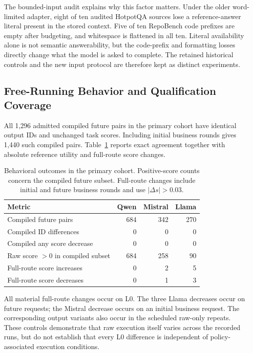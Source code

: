 The bounded-input audit explains why this factor matters. Under the older word-limited adapter, eight of ten audited HotpotQA sources lose a reference-answer literal present in the stored context. Five of ten RepoBench code prefixes are empty after budgeting, and whitespace is flattened in all ten. Literal availability alone is not semantic answerability, but the code-prefix and formatting losses directly change what the model is asked to complete. The retained historical controls and the new input protocol are therefore kept as distinct experiments.

\subsection{Free-Running Behavior and Qualification Coverage}
\label{sec:quality}
All 1,296 admitted compiled future pairs in the primary cohort have identical output IDs and unchanged task scores. Including initial business rounds gives 1,440 such compiled pairs. Table~\ref{tab:quality} reports exact agreement together with absolute reference utility and full-route score changes.

\begin{table}[t]
\centering\small
\caption{Behavioral outcomes in the primary cohort. Positive-score counts concern the compiled future subset. Full-route changes include initial and future business rounds and use $|\Delta s|>0.03$.}
\label{tab:quality}
\begin{tabular}{@{}lrrr@{}}
\toprule
Metric & Qwen & Mistral & Llama\\
\midrule
Compiled future pairs & 684 & 342 & 270\\
Compiled ID differences & 0 & 0 & 0\\
Compiled any score decrease & 0 & 0 & 0\\
Raw score $>0$ in compiled subset & 684 & 258 & 90\\
Full-route score increases & 0 & 2 & 5\\
Full-route score decreases & 0 & 1 & 3\\
\bottomrule
\end{tabular}
\end{table}

All material full-route changes occur on L0. The three Llama decreases occur on future requests; the Mistral decrease occurs on an initial business request. The corresponding output variants also occur in the scheduled raw-only repeats. These controls demonstrate that raw execution itself varies across the recorded runs, but do not establish that every L0 difference is independent of policy-associated execution conditions.

